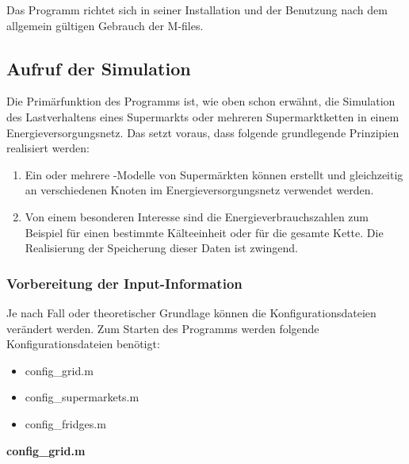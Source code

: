 Das Programm richtet sich in seiner Installation und der Benutzung nach dem allgemein gültigen Gebrauch der \matlab
M-files.

\subsection{Aufruf der Simulation}%

Die Primärfunktion des Programms ist, wie oben schon erwähnt, die Simulation des Lastverhaltens eines Supermarkts oder
mehreren Supermarktketten in einem Energieversorgungsnetz. Das setzt voraus, dass folgende grundlegende Prinzipien realisiert
werden:
\begin{enumerate}
	\item Ein oder mehrere \matlab-Modelle von Supermärkten können erstellt und gleichzeitig an verschiedenen Knoten im
		Energieversorgungsnetz verwendet werden.
	\item Von einem besonderen Interesse sind die Energieverbrauchszahlen zum Beispiel für einen bestimmte Kälteeinheit
		oder für die gesamte Kette. Die Realisierung der Speicherung dieser Daten ist zwingend.
\end{enumerate}

\subsubsection{Vorbereitung der Input-Information}
\label{sec:input_infos}

Je nach Fall oder theoretischer Grundlage können die Konfigurationsdateien verändert werden.
Zum Starten des Programms werden folgende Konfigurationsdateien benötigt:

\begin{itemize}
	\item config\_grid.m
	\item config\_supermarkets.m
	\item config\_fridges.m
\end{itemize}
\vspace{3mm}
\noindent\textbf{config\_grid.m}
\vspace{3mm}

